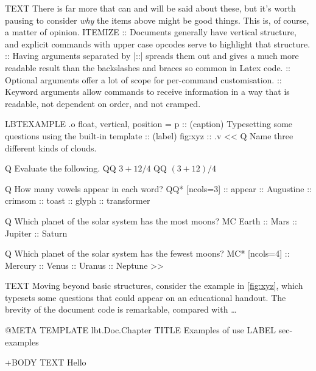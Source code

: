 \documentclass[a4paper,oneside,11pt,article]{memoir}
\begin{document}
\begin{lbt}
    TEXT There is far more that can and will be said about these, but it's worth pausing to consider \emph{why} the items above might be good things. This is, of course, a matter of opinion.
    ITEMIZE
    :: Documents generally have vertical structure, and explicit commands with upper case opcodes serve to highlight that structure.
    :: Having arguments separated by |::| spreads them out and gives a much more readable result than the backslashes and braces so common in Latex code.
    :: Optional arguments offer a lot of scope for per-command customisation.
    :: Keyword arguments allow commands to receive information in a way that is readable, not dependent on order, and not cramped.

    LBTEXAMPLE .o float, vertical, position = p
    :: (caption) Typesetting some questions using the built-in  template
    :: (label) fig:xyz
    :: .v <<
      Q Name three different kinds of clouds.

      Q Evaluate the following.
      QQ $3 + 12 / 4$
      QQ $(3 + 12) / 4$

      Q How many vowels appear in each word?
      QQ* [ncols=3]
      :: appear :: Augustine :: crimsom :: toast :: glyph :: transformer

      Q Which planet of the solar system has the most moons?
      MC Earth :: Mars :: Jupiter :: Saturn

      Q Which planet of the solar system has the fewest moons?
      MC* [ncols=4] :: Mercury :: Venus :: Uranus :: Neptune
    >>

    TEXT Moving beyond basic structures, consider the example in \cref{fig:xyz}, which typesets some questions that could appear on an educational handout. The brevity of the document code is remarkable, compared with \dots
\end{lbt}

\begin{lbt}
  @META
    TEMPLATE   lbt.Doc.Chapter
    TITLE      Examples of use
    LABEL      sec-examples

  +BODY
    TEXT Hello
\end{lbt}
\end{document}
